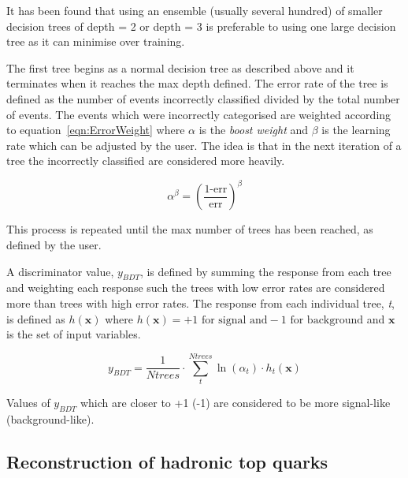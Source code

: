 It has been found that using an ensemble (usually several hundred) of smaller decision trees of depth = 2 or depth = 3 is preferable to using one large decision tree as it can minimise over training. 

The first tree begins as a normal decision tree as described above and it terminates when it reaches the max depth defined. The error rate of the tree is defined as the number of events incorrectly classified divided by the total number of events. The events which were incorrectly categorised are weighted according to equation~\ref{eqn:ErrorWeight} where $\alpha$ is the \emph{boost weight} and $\beta$ is the learning rate which can be adjusted by the user. The idea is that in the next iteration of a tree the incorrectly classified are considered more heavily. 

\begin{equation}
\alpha^{\beta} = \left( \frac{\textrm{1-err}}{\textrm{err}}  \right)^{\beta}
\end{equation}

This process is repeated until the max number of trees has been reached, as defined by the user. 

A discriminator value, $y_{BDT}$, is defined by summing the response from each tree and weighting each response such the trees with low error rates are considered more than trees with high error rates. The response from each individual tree, \emph{t}, is defined as $h\left(\textbf{x}\right)$ where $h\left(\textbf{x}\right) = +1 \textrm{ for signal and} -1 \textrm{ for background}$ and $\textbf{x}$ is the set of input variables. 

\begin{equation}
y_{BDT} = \frac{1}{Ntrees} \cdot \sum_{t}^{Ntrees} \ln \left(\alpha_{t}\right) \cdot h_{t}\left(\textbf{x}\right)
\end{equation}

Values of $y_{BDT}$ which are closer to +1 (-1) are considered to be more signal-like (background-like).

\subsection{Reconstruction of hadronic top quarks}

